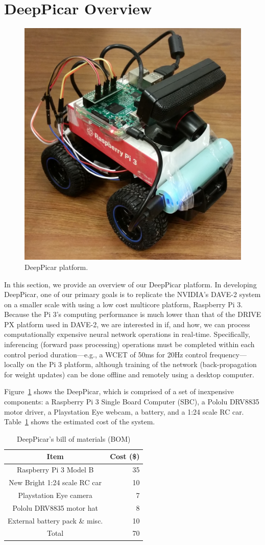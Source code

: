 \section{DeepPicar Overview}

\begin{figure}[t]
  \centering
  \includegraphics[width=.55\textwidth]{figs/DeepPicar_platform}
  \caption{DeepPicar platform.}
  \label{fig:overview}
\end{figure}

In this section, we provide an overview of our DeepPicar platform. In
developing DeepPicar, one of our primary goals is to replicate the
NVIDIA's DAVE-2 system on a smaller scale with using a low cost
multicore platform, Raspberry Pi 3. Because the Pi 3's computing
performance is much lower than that of the DRIVE PX platform used in
DAVE-2, we are interested in if, and how, we can process
computationally expensive neural network operations in
real-time. Specifically, inferencing (forward pass processing)
operations must be completed within each control period
duration---e.g., a WCET of 50ms for 20Hz control frequency---locally on
the Pi 3 platform, although training of the network (back-propagation
for weight updates) can be done offline and remotely using a desktop
computer.

Figure~\ref{fig:overview} shows the DeepPicar, which is comprised of a
set of inexpensive components: a Raspberry Pi 3 Single Board Computer
(SBC), a Pololu DRV8835 motor driver, a Playstation Eye webcam, a
battery, and a 1:24 scale RC car. Table~\ref{tbl:carbom} shows the
estimated cost of the system.

\begin{table}[t]
  \centering
  \begin{tabular}{|c|r|}
    \hline
    Item                    & Cost (\$) \\
    \hline
    Raspberry Pi 3 Model B  & 35 \\
    New Bright 1:24 scale RC car       & 10 \\
    Playstation Eye camera  &  7 \\
    Pololu DRV8835 motor hat&  8 \\
    External battery pack \& misc.   & 10 \\
    \hline
    Total                   & 70 \\
    \hline
  \end{tabular}
  \caption{DeepPicar's bill of materials (BOM)}
  \label{tbl:carbom}
\end{table}

